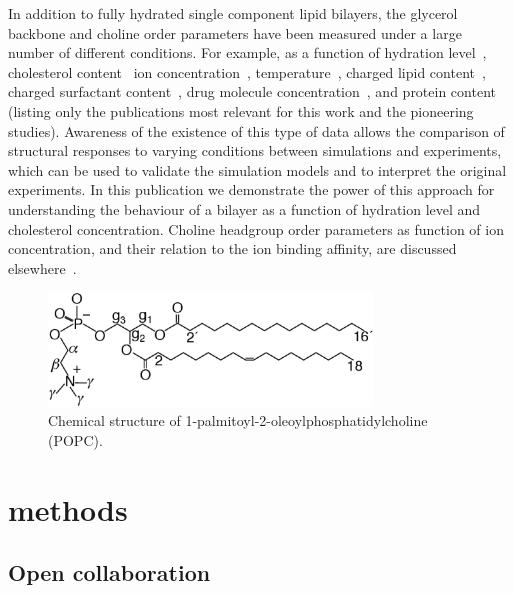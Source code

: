 \documentclass[pre,aps,floatfix,authordate1-4,twocolumn]{revtex4-1}
\begin{document}
In addition to fully hydrated single component lipid bilayers, the glycerol backbone and choline order parameters
have been measured under a large number of different conditions. For example, as a function of hydration level~\cite{bechinger91,ulrich94,dvinskikh05b}, cholesterol content~\cite{brown78,ferreira13}
ion concentration~\cite{brown77,akutsu81,altenbach84,roux90,roux91}, temperature~\cite{gally75}, charged lipid content~\cite{roux90,roux91}, charged surfactant content~\cite{scherer89}, 
drug molecule concentration~\cite{browning82,kelusky84,castro08}, and protein content~\cite{roux89,kuchinka89} (listing only the publications most relevant for this work and the pioneering studies).
Awareness of the existence of this type of data allows the comparison of structural responses to varying conditions between simulations and experiments,
which can be used to validate the simulation models and to interpret the original experiments. 
In this publication we demonstrate the power of this approach for understanding the behaviour of a bilayer as a function of hydration level and cholesterol concentration.
Choline headgroup order parameters as function of ion concentration, and their relation to the ion binding affinity, are discussed elsewhere~\cite{ionpaper}.

  \begin{figure}[]
  \centering
  \includegraphics[width=8.6cm]{POPCstructure.eps}

  \caption{\label{POPCstructure}
    Chemical structure of  1-palmitoyl-2-oleoylphosphatidylcholine (POPC).}
  
\end{figure}

\section{methods}

\subsection{Open collaboration}
\end{document}
